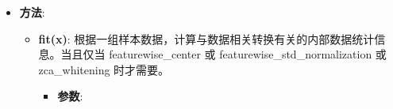 \begin{itemize}
\begin{itemize}
    \begin{itemize}
    \tightlist
    \item
      "constant": \texttt{kkkkkkkk\textbar{}abcd\textbar{}kkkkkkkk}
      (\texttt{cval=k})
    \item
      "nearest": \texttt{aaaaaaaa\textbar{}abcd\textbar{}dddddddd}
    \item
      "reflect": \texttt{abcddcba\textbar{}abcd\textbar{}dcbaabcd}
    \item
      "wrap": \texttt{abcdabcd\textbar{}abcd\textbar{}abcdabcd}
    \end{itemize}
  \item
    \textbf{cval}: 浮点数或整数。用于边界之外的点的值，当
    \texttt{fill\_mode\ =\ "constant"} 时。
  \item
    \textbf{horizontal\_flip}: 布尔值。随机水平翻转。
  \item
    \textbf{vertical\_flip}: 布尔值。随机垂直翻转。
  \item
    \textbf{rescale}: 重缩放因子。默认为 None。如果是 None 或
    0，不进行缩放，否则将数据乘以所提供的值（在应用任何其他转换之前）。
  \item
    \textbf{preprocessing\_function}:
    应用于每个输入的函数。这个函数会在任何其他改变之前运行。这个函数需要一个参数：一张图像（秩为
    3 的 Numpy 张量），并且应该输出一个同尺寸的 Numpy 张量。
  \item
    \textbf{data\_format}: \{"channels\_first", "channels\_last"\}
    之一。"channels\_last" 模式表示输入尺寸应该为
    \texttt{(samples,\ height,\ width,\ channels)}，"channels\_first"
    模式表示输入尺寸应该为
    \texttt{(samples,\ channels,\ height,\ width)}。默认为 在 Keras
    配置文件 \texttt{\textasciitilde{}/.keras/keras.json} 中的
    \texttt{image\_data\_format} 值。如果你从未设置它，那它就是
    "channels\_last"。
  \end{itemize}
\item
  \textbf{方法}:

  \begin{itemize}
  \tightlist
  \item
    \textbf{fit(x)}:
    根据一组样本数据，计算与数据相关转换有关的内部数据统计信息。当且仅当
    featurewise\_center 或 featurewise\_std\_normalization 或
    zca\_whitening 时才需要。

    \begin{itemize}
    \tightlist
    \item
      \textbf{参数}:


\end{itemize}
\end{itemize}
\end{itemize}
